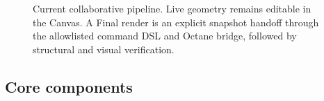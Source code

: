 \documentclass[11pt,a4paper]{article}
\begin{document}
\begin{figure}[htbp]
\centering
{}
\caption{Current collaborative pipeline. Live geometry remains editable in the Canvas. A Final render is an explicit snapshot handoff through the allowlisted command DSL and Octane bridge, followed by structural and visual verification.}
\label{fig:pipeline}
\end{figure}

\subsection{Core components}
\end{document}
